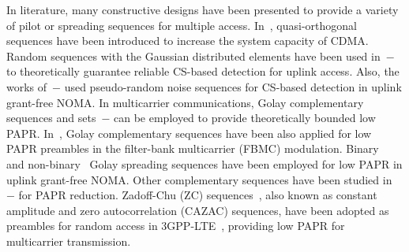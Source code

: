 \documentclass[journal]{IEEEtran}
\numberwithin{const2}{const}
\begin{document}
In literature,
many constructive designs have been presented 
to provide a variety of pilot or spreading sequences for %
multiple access.
In~\cite{Yang:qos}, quasi-orthogonal sequences have been introduced
to increase the system capacity of CDMA.
Random sequences with the Gaussian distributed elements have been used in~\cite{Liu:mimo}$-$\cite{Jiang:noma}
to theoretically guarantee reliable CS-based detection %
for uplink access.
Also, the works of~\cite{Wang:struct}$-$\cite{Du:block} %
used pseudo-random noise sequences 
for CS-based detection in uplink grant-free NOMA.
In multicarrier communications,
Golay complementary sequences and sets~\cite{Golay:series}$-$\cite{Paterson:gen} 
can be employed to provide theoretically bounded low PAPR.
In~\cite{Liu:FBMC}, Golay complementary sequences have been also applied for 
low PAPR preambles in the filter-bank multicarrier (FBMC) modulation.
Binary~\cite{Yu:binary} and non-binary~\cite{Yu:non} Golay spreading sequences have been employed for low PAPR in uplink grant-free NOMA.
Other complementary sequences have been studied in~\cite{Liu:comp}$-$\cite{Wu:Z}
for PAPR reduction. %
Zadoff-Chu (ZC) sequences~\cite{Chu:ZC}, also known as constant amplitude and zero autocorrelation (CAZAC) sequences,
have been adopted as preambles for random access
in 3GPP-LTE~\cite{3gpp:36.211},
providing low PAPR for multicarrier transmission.
\end{document}
